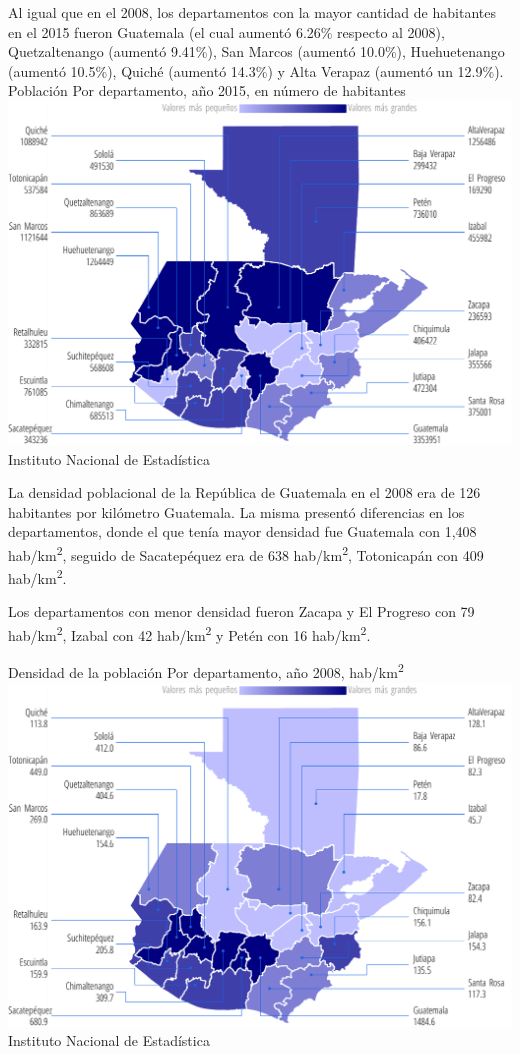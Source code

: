    
    {%
Al igual que en el 2008, los departamentos con la mayor cantidad de habitantes en el 2015 fueron Guatemala (el cual aumentó 6.26\% respecto al 2008), Quetzaltenango (aumentó 9.41\%), San Marcos (aumentó 10.0\%), Huehuetenango (aumentó 10.5\%), Quiché (aumentó 14.3\%) y Alta Verapaz (aumentó un 12.9\%).  }%
    {%
    Población
    } %
    {%
  Por departamento, año 2015, en número de habitantes} %
    {%
    	\includegraphics[width=52\cuadri]{graficas/1_03.pdf}}%
    {%
    	Instituto Nacional de Estadística} %
    
    
    
   {%
La densidad poblacional de la República de Guatemala en el 2008 era de 126 habitantes por kilómetro Guatemala. La misma presentó diferencias en los departamentos, donde el que tenía mayor densidad fue Guatemala con 1,408 hab/km\textsuperscript2, seguido de Sacatepéquez era de 638 hab/km\textsuperscript2, Totonicapán con 409 hab/km\textsuperscript2.

Los departamentos con menor densidad fueron Zacapa y El Progreso con 79 hab/km\textsuperscript2, Izabal con 42 hab/km\textsuperscript2 y Petén con 16 hab/km\textsuperscript2.}%
   {%
   	Densidad de la población
   } %
   {%
   	Por departamento, año 2008, hab/km\textsuperscript2} %
   {%
   	\includegraphics[width=52\cuadri]{graficas/1_05.pdf}}%
   {%
   	Instituto Nacional de Estadística} %
   
